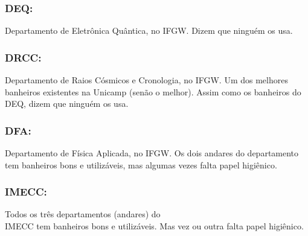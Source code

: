 \subsubsection{DEQ:} Departamento de Eletrônica Quântica, no IFGW. Dizem que
ninguém os usa.

\subsubsection{DRCC:} Departamento de Raios Cósmicos e Cronologia, no IFGW. Um
dos melhores banheiros existentes na Unicamp (senão o melhor). Assim como os
banheiros do DEQ, dizem que ninguém os usa.

\subsubsection{DFA:} Departamento de Física Aplicada, no IFGW. Os dois andares
do departamento tem banheiros bons e utilizáveis, mas algumas vezes falta
papel higiênico.

\subsubsection{IMECC:} Todos os três departamentos (andares) do\\IMECC tem
banheiros bons e utilizáveis. Mas vez ou outra falta papel higiênico.
